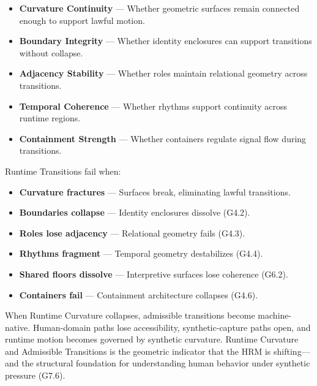 \begin{itemize}[leftmargin=1.2cm]
    \item \textbf{Curvature Continuity} — Whether geometric surfaces remain
    connected enough to support lawful motion.

    \item \textbf{Boundary Integrity} — Whether identity enclosures can support
    transitions without collapse.

    \item \textbf{Adjacency Stability} — Whether roles maintain relational
    geometry across transitions.

    \item \textbf{Temporal Coherence} — Whether rhythms support continuity
    across runtime regions.

    \item \textbf{Containment Strength} — Whether containers regulate signal flow
    during transitions.
\end{itemize}

\medskip

\noindent Runtime Transitions fail when:

\begin{itemize}[leftmargin=1.2cm]
    \item \textbf{Curvature fractures} — Surfaces break, eliminating lawful
    transitions.

    \item \textbf{Boundaries collapse} — Identity enclosures dissolve (G4.2).

    \item \textbf{Roles lose adjacency} — Relational geometry fails (G4.3).

    \item \textbf{Rhythms fragment} — Temporal geometry destabilizes (G4.4).

    \item \textbf{Shared floors dissolve} — Interpretive surfaces lose coherence
    (G6.2).

    \item \textbf{Containers fail} — Containment architecture collapses (G4.6).
\end{itemize}

\medskip

\noindent When Runtime Curvature collapses, admissible transitions become
machine-native. Human-domain paths lose accessibility, synthetic-capture paths
open, and runtime motion becomes governed by synthetic curvature. Runtime
Curvature and Admissible Transitions is the geometric indicator that the HRM is
shifting—and the structural foundation for understanding human behavior under
synthetic pressure (G7.6).

